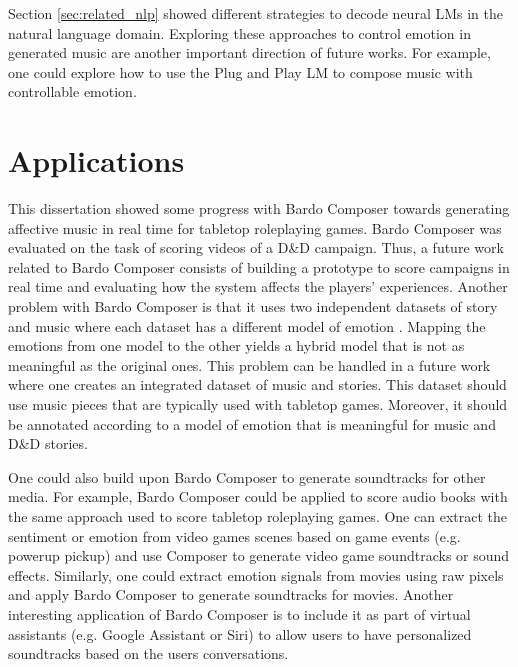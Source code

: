Section \ref{sec:related_nlp} showed different strategies to decode neural LMs in the natural language domain. Exploring these approaches to control emotion in generated music are another important direction of future works. For example, one could explore how to use the Plug and Play LM \cite{dathathri2019plug} to compose music with controllable emotion.

\section{Applications}

This dissertation showed some progress with Bardo Composer towards generating affective music in real time for tabletop roleplaying games. Bardo Composer was evaluated on the task of scoring videos of a D\&D campaign. Thus, a future work related to Bardo Composer consists of building a prototype to score campaigns in real time and evaluating how the system affects the players' experiences. Another problem with Bardo Composer is that it uses two independent datasets of story and music where each dataset has a different model of emotion \cite{padovani2017}. Mapping the emotions from one model to the other yields a hybrid model that is not as meaningful as the original ones. This problem can be handled in a future work where one creates an integrated dataset of music and stories. This dataset should use music pieces that are typically used with tabletop games. Moreover, it should be annotated according to a model of emotion that is meaningful for music and D\&D stories.

One could also build upon Bardo Composer to generate soundtracks for other media. For example, Bardo Composer could be applied to score audio books with the same approach used to score tabletop roleplaying games. One can extract the sentiment or emotion from video games scenes based on game events (e.g. powerup pickup) and use Composer to generate video game soundtracks or sound effects. Similarly, one could extract emotion signals from movies using raw pixels and apply Bardo Composer to generate soundtracks for movies. Another interesting application of Bardo Composer is to include it as part of virtual assistants (e.g. Google Assistant or Siri) to allow users to have personalized soundtracks based on the users conversations.
